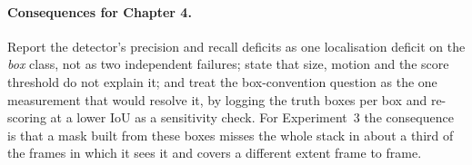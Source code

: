 \documentclass[11pt,a4paper,notitlepage]{report}
\begin{document}
\paragraph{Consequences for Chapter 4.} Report the detector's precision and
recall deficits as one localisation deficit on the \emph{box} class, not as two
independent failures; state that size, motion and the score threshold do not
explain it; and treat the box-convention question as the one measurement that
would resolve it, by logging the truth boxes per box and re-scoring at a lower
IoU as a sensitivity check. For Experiment~3 the consequence is that a mask
built from these boxes misses the whole stack in about a third of the frames
in which it sees it and covers a different extent frame to frame.
\end{document}
